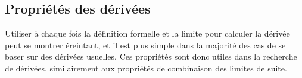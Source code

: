     
    
    
    
    
    

\subsection{Propriétés des dérivées}
Utiliser à chaque fois la définition formelle et la limite pour calculer la dérivée peut se montrer éreintant, et il est plus simple dans la majorité des cas de se baser sur des dérivées usuelles. Ces propriétés sont donc utiles dans la recherche de dérivées, similairement aux propriétés de combinaison des limites de suite.

